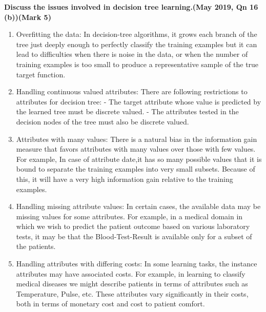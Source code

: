 
\textbf{\textcolor{LightMagenta}{Discuss the issues involved in decision tree learning.(May 2019, Qn 16 (b))\hfill (Mark 5)}} \\[5pt]
\begin{enumerate}
\item Overfitting the data: 
 In decision-tree algorithms, it grows each branch of the tree just deeply enough to perfectly classify the training examples but it can lead to difficulties when there is noise in the data, or when the number of training examples is too small to produce a representative sample of the true target function. 
     \item Handling continuous valued attributes:
      There are following restrictions to attributes for decision tree:
   - The target attribute whose value is predicted by the learned tree must be discrete            valued.
   - The attributes tested in the decision nodes of the tree must also be discrete valued.
   
    \item Attributes with many values:
    There is a natural bias in the information gain measure that favors attributes with many values over those with few values.
For example, In case of attribute date,it has so many possible values that it is bound to separate the training examples into very small subsets. Because of this, it will have a very high information gain relative to the training examples.
    \item Handling missing attribute values:
    In certain cases, the available data may be missing values for some attributes. For example, in a medical domain in which we wish to predict the patient outcome based on various laboratory tests, it may be that the Blood-Test-Result is available only for a subset of the patients.
    \item Handling attributes with differing costs:
    In some learning tasks, the instance attributes may have associated costs. For example, in learning to classify medical diseases we might describe patients in terms of attributes such as Temperature, Pulse, etc. These attributes vary significantly in their costs, both in terms of monetary cost and cost to patient comfort.
\end{enumerate}


 



 
 


 
        
